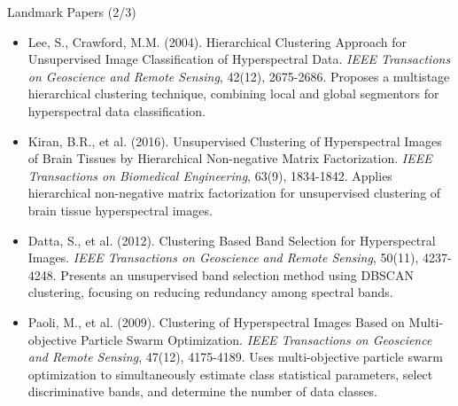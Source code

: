 \documentclass[10pt,svgnames,fragile]{beamer}
\begin{document}
\begin{frame}{Landmark Papers (2/3)}
\footnotesize
\begin{itemize}
    \item Lee, S., Crawford, M.M. (2004). Hierarchical Clustering Approach for Unsupervised Image Classification of Hyperspectral Data. \textit{IEEE Transactions on Geoscience and Remote Sensing}, 42(12), 2675-2686. \href{https://consensus.app/papers/clustering-approach-image-classification-data-lee/7e01c6a70ab75aae8291e5d179d7374e/?utm_source=chatgpt}{\color{blue}{DOI: 10.1109/TGRS.2004.834614}}
    {\color{gray}Proposes a multistage hierarchical clustering technique, combining local and global segmentors for hyperspectral data classification.}

    \item Kiran, B.R., et al. (2016). Unsupervised Clustering of Hyperspectral Images of Brain Tissues by Hierarchical Non-negative Matrix Factorization. \textit{IEEE Transactions on Biomedical Engineering}, 63(9), 1834-1842. \href{https://consensus.app/papers/unsupervised-clustering-hyperspectral-images-brain-kiran/0612dc71f71f5118a9467490481ad6be/?utm_source=chatgpt}{\color{blue}{DOI: 10.1109/TBME.2015.2509484}}
    {\color{gray}Applies hierarchical non-negative matrix factorization for unsupervised clustering of brain tissue hyperspectral images.}

    \item Datta, S., et al. (2012). Clustering Based Band Selection for Hyperspectral Images. \textit{IEEE Transactions on Geoscience and Remote Sensing}, 50(11), 4237-4248. \href{https://consensus.app/papers/clustering-based-band-selection-images-datta/78493a3d39e8521db170ba8cad157c2a/?utm_source=chatgpt}{\color{blue}{DOI: 10.1109/TGRS.2012.2186344}}
    {\color{gray}Presents an unsupervised band selection method using DBSCAN clustering, focusing on reducing redundancy among spectral bands.}

    \item Paoli, M., et al. (2009). Clustering of Hyperspectral Images Based on Multi-objective Particle Swarm Optimization. \textit{IEEE Transactions on Geoscience and Remote Sensing}, 47(12), 4175-4189. \href{https://consensus.app/papers/clustering-hyperspectral-images-based-multiobjective-paoli/76e19f51eed85904a08c9b811f014d8f/?utm_source=chatgpt}{\color{blue}{DOI: 10.1109/TGRS.2009.2025099}}
    {\color{gray}Uses multi-objective particle swarm optimization to simultaneously estimate class statistical parameters, select discriminative bands, and determine the number of data classes.}
\end{itemize}
\end{frame}
\end{document}
